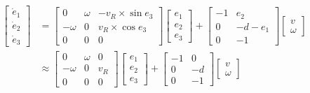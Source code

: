           \begin{align}
               \begin{bmatrix}
               \dot{e}_1 \\
               \dot{e}_2 \\
               \dot{e}_3
               \end{bmatrix} &= \begin{bmatrix}
               0 & \omega & -v_R \times \sin e_3 \\
               -\omega & 0 & v_R \times \cos e_3 \\
               0 & 0 & 0
               \end{bmatrix} \begin{bmatrix}
               e_1 \\
               e_2 \\
               e_3
               \end{bmatrix} + \begin{bmatrix}
               -1 & e_2 \\
               0 & -d - e_1 \\
               0 & -1
               \end{bmatrix} \begin{bmatrix}
               v \\
               \omega
               \end{bmatrix}\\
               &\approx \begin{bmatrix}
               0 & \omega & 0 \\
               -\omega & 0 & v_R \\
               0 & 0 & 0
               \end{bmatrix} \begin{bmatrix}
               e_1 \\
               e_2 \\
               e_3
               \end{bmatrix} + \begin{bmatrix}
               -1 & 0 \\
               0 & -d \\
               0 & -1
               \end{bmatrix} \begin{bmatrix}
               v \\
               \omega
               \end{bmatrix}
               \label{c6_e4}
          \end{align}
